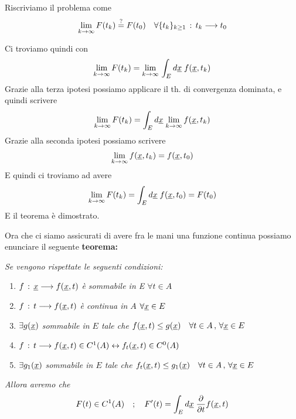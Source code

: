 Riscriviamo il problema come
\begin{align}
	\underset{k \rightarrow \infty}{\lim} \, F(t_k) \overset{?}{=} F(t_0) \quad \forall \{ t_k \}_{k\geq 1} \, : \, t_k \longrightarrow t_0
\end{align}

Ci troviamo quindi con
\begin{align}
	\underset{k \rightarrow \infty}{\lim} \, F(t_k) = \underset{k \rightarrow \infty}{\lim} \, \int_{E} d\underline{x} \; f(\underline{x},t_k)
\end{align}
Grazie alla terza ipotesi possiamo applicare il th. di convergenza dominata, e quindi scrivere
\begin{align}
	\underset{k \rightarrow \infty}{\lim} \, F(t_k) = \int_{E} d\underline{x} \; \underset{k \rightarrow \infty}{\lim} \, f(\underline{x},t_k)
\end{align}
Grazie alla seconda ipotesi possiamo scrivere
\begin{align}
	\underset{k \rightarrow \infty}{\lim} \, f(\underline{x},t_k) = f(\underline{x},t_0)
\end{align}
E quindi ci troviamo ad avere
\begin{align}
	\underset{k \rightarrow \infty}{\lim} \, F(t_k) = \int_{E} d\underline{x} \; f(\underline{x},t_0) = F(t_0)
\end{align}
E il teorema è dimostrato.

\bigskip

Ora che ci siamo assicurati di avere fra le mani una funzione continua possiamo enunciare il seguente \textbf{teorema:}

\bigskip

\textit{Se vengono rispettate le seguenti condizioni:}
\begin{enumerate}
	\item $f \, : \, \underline{x} \longrightarrow f(\underline{x},t)$ \textit{è sommabile in E $\forall t \in A$}
	\item $f \, : \, t \longrightarrow f(\underline{x},t)$ \textit{è continua \qo in $A$ $\forall \underline{x} \in E$}
	\item $\exists g(\underline{x})$ \textit{sommabile in $E$ tale che $f(\underline{x},t)\leq g(\underline{x}) \quad \forall t \in A \, , \, \forall \underline{x} \in E$ \qo}
	\item $f \, : \, t \longrightarrow f(\underline{x},t)\in C^1(A) \leftrightarrow f_t(\underline{x},t)\in C^0(A)$ 
	\item $\exists g_1(\underline{x})$ \textit{sommabile in $E$ tale che $f_t(\underline{x},t)\leq g_1(\underline{x}) \quad \forall t \in A \, , \, \forall \underline{x} \in E$ \qo}
\end{enumerate}

\textit{Allora avremo che}
\begin{align}
	F(t)\in C^1(A) \quad ; \quad F'(t)= \int_{E} d\underline{x} \; \frac{\partial }{\partial t}f(\underline{x},t)
\end{align}

